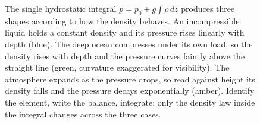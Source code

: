 \begin{figure}[htbp]
\centering
{}
\caption[One integral, three density laws]{The single hydrostatic integral
$p=p_0+g\int\rho\,dz$ produces three shapes according to how the density behaves.
An incompressible liquid holds a constant density and its pressure rises linearly
with depth (blue). The deep ocean compresses under its own load, so the density
rises with depth and the pressure curves faintly above the straight line (green,
curvature exaggerated for visibility). The atmosphere expands as the pressure
drops, so read against height its density falls and the pressure decays
exponentially (amber). Identify the element, write the balance, integrate: only
the density law inside the integral changes across the three cases.}
\label{fig:vol03ch10:density-laws}
\end{figure}
